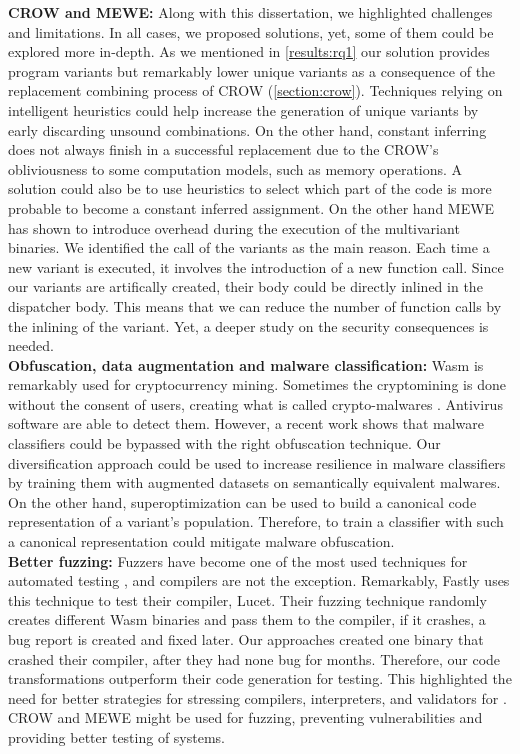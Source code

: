 \textbf{CROW and MEWE:} Along with this dissertation, we highlighted challenges and limitations. In all cases, we proposed solutions, yet, some of them could be explored more in-depth.
As we mentioned in \autoref{results:rq1} our solution provides program variants but remarkably lower unique variants as a consequence of the replacement combining process of CROW (\autoref{section:crow}). 
Techniques relying on intelligent heuristics could help increase the generation of unique variants by early discarding unsound combinations.
On the other hand, constant inferring does not always finish in a successful replacement due to the CROW's obliviousness to some computation models, such as memory operations. 
A solution could also be to use heuristics to select which part of the code is more probable to become a constant inferred assignment.
On the other hand MEWE has shown to introduce overhead during the execution of the multivariant binaries.
We identified the call of the variants as the main reason.
Each time a new variant is executed, it involves the introduction of a new function call.
Since our variants are artifically created, their body could be directly inlined in the dispatcher body.
This means that we can reduce the number of function calls by the inlining of the variant.
Yet, a deeper study on the security consequences is needed.
\\

\textbf{Obfuscation, data augmentation and malware classification:}
Wasm is remarkably used for cryptocurrency mining. 
Sometimes the cryptomining is done without the consent of users, creating what is called crypto-malwares \cite{Hilbig2021AnES}.
Antivirus software are able to detect them. 
However, a recent work \cite{10.1145/3507657.3528560} shows that malware classifiers could be bypassed with the right obfuscation technique.
Our diversification approach could be used to increase resilience in malware classifiers by training them with augmented datasets on semantically equivalent malwares.
On the other hand, superoptimization can be used to build a canonical code representation of a variant's population.
Therefore, to train a classifier with such a canonical representation could mitigate malware obfuscation.
\\

\textbf{Better fuzzing:}
Fuzzers have become one of the most used techniques for automated testing \cite{zalewski2017american}, and compilers are not the exception.
Remarkably, Fastly uses this technique to test their compiler, Lucet.
Their fuzzing technique randomly creates different Wasm binaries and pass them to the compiler, if it crashes, a bug report is created and fixed later.
Our approaches created one binary that crashed their compiler\cite{CVE}, after they had none bug for months.
Therefore, our code transformations outperform their code generation for testing. 
This highlighted the need for better strategies for stressing compilers, interpreters, and validators for \wasm.
CROW and MEWE might be used for fuzzing, preventing vulnerabilities and providing better testing of systems.


